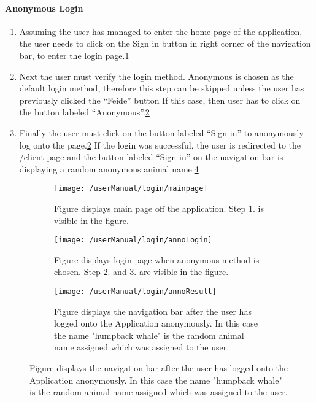 \paragraph{Anonymous Login}
\begin{enumerate}
	\item Assuming the user has managed to enter the home page of the application, the user needs to click on the Sign in button in right 				  corner of the navigation bar, to enter the login page.\ref{fig:annoMainPage}
	\item Next the user must verify the login method. Anonymous is chosen as the default login method, therefore this step can be skipped 				  unless the user has previously clicked the “Feide” button If this case, then user has to click on the button labeled “Anonymous”.\ref{fig:annoLogin}
	\item Finally the user must click on the button labeled “Sign in” to anonymously log onto the page.\ref{fig:annoLogin} If the login was 			  successful, the user is redirected to the /client page and the button labeled “Sign in” on the navigation bar is displaying a random 		  anonymous animal name.\ref{fig:annoResult}
\end{enumerate}
\begin{figure}[H]
    \centering
    \begin{subfigure}{0.60\linewidth}
        \texttt{[image: /userManual/login/mainpage]}
       	\caption{Figure displays main page off the application. Step 1. is visible in the figure.}
		\label{fig:annoMainPage}	
    \end{subfigure}
    \begin{subfigure}{0.60\linewidth}
        \texttt{[image: /userManual/login/annoLogin]}
      	\caption{Figure displays login page when anonymous method is chosen. Step 2. and 3. are visible in the figure.}
		\label{fig:annoLogin}	
    \end{subfigure}
    \begin{subfigure}{0.60\linewidth}
    	\texttt{[image: /userManual/login/annoResult]}
    	\caption{Figure displays the navigation bar after the user has logged onto the Application anonymously. In this case the name "humpback whale" is the random animal name assigned which was assigned to the user.}
    	\label{fig:annoResult}	
    \end{subfigure}
\end{figure}
